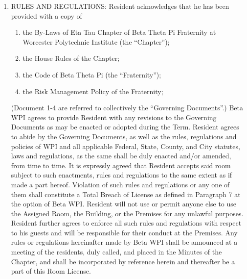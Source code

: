 \documentclass[legalpaper, 12pt]{article} \usepackage{lease}
\begin{document}
\begin{enumerate}
        \item RULES AND REGULATIONS: Resident acknowledges that he has been
                provided with a copy of 

        \begin{enumerate}[label=\arabic*)]

                \item the By-Laws of Eta Tau Chapter of Beta Theta Pi Fraternity
                        at Worcester Polytechnic Institute (the ``Chapter''); 

                \item the House Rules of the Chapter; 

                \item the Code of Beta Theta Pi (the ``Fraternity'');

                \item the Risk Management Policy of the Fraternity;

        \end{enumerate}

                (Document 1-4 are referred to collectively the ``Governing
                Documents''.) Beta WPI agrees to provide Resident with any
                revisions to the Governing Documents as may be enacted or
                adopted during the Term.  Resident agrees to abide by the
                Governing Documents, as well as the rules, regulations and
                policies of WPI and all applicable Federal, State, County, and
                City statutes, laws and regulations, as the same shall be duly
                enacted and/or amended, from time to time.  It is expressly
                agreed that Resident accepts said room subject to such
                enactments, rules and regulations to the same extent as if made
                a part hereof.  Violation of such rules and regulations or any
                one of them shall constitute a Total Breach of License as
                defined in Paragraph 7 at the option of Beta WPI\@.  Resident
                will not use or permit anyone else to use the Assigned Room, the
                Building, or the Premises for any unlawful purposes.  Resident
                further agrees to enforce all such rules and regulations with
                respect to his guests and will be responsible for their conduct
                at the Premises.  Any rules or regulations hereinafter made by
                Beta WPI shall be announced at a meeting of the residents, duly
                called, and placed in the Minutes of the Chapter, and shall be
                incorporated by reference herein and thereafter be a part of
                this Room License.


\end{enumerate}
\end{document}
